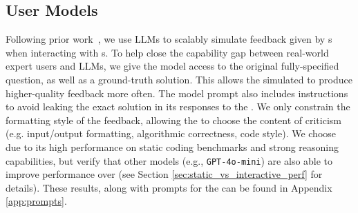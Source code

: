 \subsection{User Models}

Following prior work~\citep{dubois2023alpacafarm,zheng2023judging,mozannar2023simulating}, we use LLMs to scalably simulate feedback given by \user s when interacting with \cm s. 
To help close the capability gap between real-world expert users and LLMs, we give the \user{} model access to the original fully-specified question, as well as a ground-truth solution. 
This allows the simulated \user{} to produce higher-quality feedback more often. 
The \user{} model prompt also includes instructions to avoid leaking the exact solution in its responses to the \cm.
We only constrain the formatting style of the feedback, allowing the \user{} to choose the content of criticism (e.g. input/output formatting, algorithmic correctness, code style).
We choose \sonnet{} due to its high performance on static coding benchmarks and strong reasoning capabilities, but verify that other \user{} models (e.g., \texttt{GPT-4o-mini}) are also able to improve performance over \baseline{} (see Section \ref{sec:static_vs_interactive_perf} for details).
These results, along with prompts for the \user{} can be found in Appendix \ref{app:prompts}.






